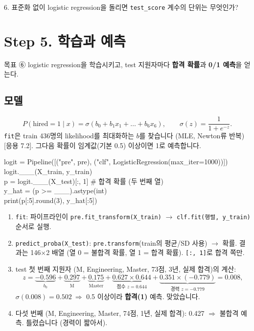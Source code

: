 \documentclass[11pt,a4paper]{article}
\newcommand{\code}[1]{\texttt{#1}}
\begin{document}
\begin{qbox}
6. 표준화 없이 logistic regression을 돌리면 \code{test\_score} 계수의 단위는 무엇인가?
\end{qbox}

\section{Step 5. 학습과 예측}
\begin{goalbox}{목표 \quad ⑥}
logistic regression을 학습시키고, test 지원자마다 \textbf{합격 확률}과 \textbf{0/1 예측}을 얻는다.
\end{goalbox}

\subsection{모델}
\[
P(\text{hired}=1\mid x)=\sigma(b_0+b_1x_1+\dots+b_6x_6),\qquad \sigma(z)=\frac1{1+e^{-z}}.
\]
\code{fit}은 train 436명의 likelihood를 최대화하는 $b$를 찾습니다 (MLE, Newton류 반복) [응용 7.2]. 그다음 확률이 임계값(기본 0.5) 이상이면 1로 예측합니다.

\begin{codebox}
logit = Pipeline([("pre", pre), ("clf", LogisticRegression(max\_iter=1000))])\\
logit.\_\_\_(X\_train, y\_train)\\
p = logit.\_\_\_(X\_test)[:, 1] \hfill \# 합격 확률 (두 번째 열)\\
y\_hat = (p >= \_\_\_).astype(int)\\
print(p[:5].round(3), y\_hat[:5])
\end{codebox}
\begin{outbox}
[0.502 0.286 0.535 0.091 0.427] [1 0 1 0 0]
\end{outbox}

\begin{howbox}
\begin{enumerate}
\item \code{fit}: 파이프라인이 \code{pre.fit\_transform(X\_train)} $\to$ \code{clf.fit(행렬, y\_train)} 순서로 실행.
\item \code{predict\_proba(X\_test)}: \code{pre.transform}(train의 평균/SD 사용) $\to$ 확률. 결과는 146$\times$2 배열 (열 0 = 불합격 확률, 열 1 = 합격 확률). \code{[:, 1]}로 합격 쪽만.
\item test 첫 번째 지원자 (M, Engineering, Master, 73점, 3년, 실제 합격)의 계산:
\[
z=\underbrace{-0.596}_{b_0}+\underbrace{0.297}_{\text{M}}+\underbrace{0.175}_{\text{Master}}+\underbrace{0.627\times0.644}_{\text{점수 }z=0.644}+\underbrace{0.351\times(-0.779)}_{\text{경력 }z=-0.779}=0.008,
\]
$\sigma(0.008)=0.502\ \Rightarrow$ 0.5 이상이라 \textbf{합격(1)} 예측. 맞았습니다.
\item 다섯 번째 (M, Engineering, Master, 74점, 1년, 실제 합격): 0.427 $\Rightarrow$ 불합격 예측. 틀렸습니다 (경력이 짧아서).
\end{enumerate}
\end{howbox}
\end{document}
